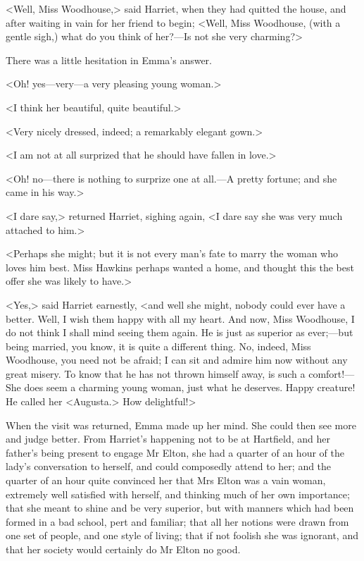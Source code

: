<Well, Miss Woodhouse,> said Harriet, when they had quitted the house, and after waiting in vain for her friend to begin; <Well, Miss Woodhouse, (with a gentle sigh,) what do you think of her?—Is not she very charming?>

There was a little hesitation in Emma's answer.

<Oh! yes—very—a very pleasing young woman.>

<I think her beautiful, quite beautiful.>

<Very nicely dressed, indeed; a remarkably elegant gown.>

<I am not at all surprized that he should have fallen in love.>

<Oh! no—there is nothing to surprize one at all.—A pretty fortune; and she came in his way.>

<I dare say,> returned Harriet, sighing again, <I dare say she was very much attached to him.>

<Perhaps she might; but it is not every man's fate to marry the woman who loves him best. Miss Hawkins perhaps wanted a home, and thought this the best offer she was likely to have.>

<Yes,> said Harriet earnestly, <and well she might, nobody could ever have a better. Well, I wish them happy with all my heart. And now, Miss Woodhouse, I do not think I shall mind seeing them again. He is just as superior as ever;—but being married, you know, it is quite a different thing. No, indeed, Miss Woodhouse, you need not be afraid; I can sit and admire him now without any great misery. To know that he has not thrown himself away, is such a comfort!—She does seem a charming young woman, just what he deserves. Happy creature! He called her <Augusta.> How delightful!>

When the visit was returned, Emma made up her mind. She could then see more and judge better. From Harriet's happening not to be at Hartfield, and her father's being present to engage Mr Elton, she had a quarter of an hour of the lady's conversation to herself, and could composedly attend to her; and the quarter of an hour quite convinced her that Mrs Elton was a vain woman, extremely well satisfied with herself, and thinking much of her own importance; that she meant to shine and be very superior, but with manners which had been formed in a bad school, pert and familiar; that all her notions were drawn from one set of people, and one style of living; that if not foolish she was ignorant, and that her society would certainly do Mr Elton no good.

